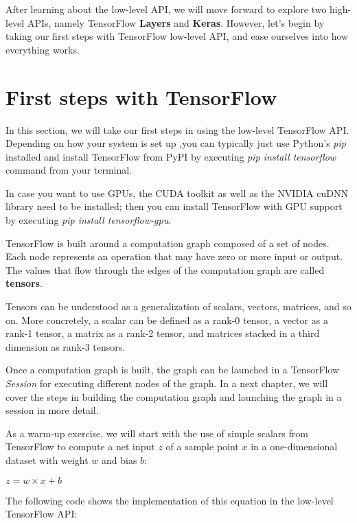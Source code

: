 \documentclass[11pt]{article}
\begin{document}
After learning about the low-level API, we will move forward to explore
two high-level APIs, namely TensorFlow \textbf{Layers} and
\textbf{Keras}. However, let's begin by taking our first steps with
TensorFlow low-level API, and ease ourselves into how everything works.

    \section{First steps with TensorFlow}\label{first-steps-with-tensorflow}

    In this section, we will take our first steps in using the low-level
TensorFlow API. Depending on how your system is set up ,you can
typically just use Python's \emph{pip} installed and install TensorFlow
from PyPI by executing \emph{pip install tensorflow} command from your
terminal.

In case you want to use GPUs, the CUDA toolkit as well as the NVIDIA
cuDNN library need to be installed; then you can install TensorFlow with
GPU support by executing \emph{pip install tensorflow-gpu}.

TensorFlow is built around a computation graph composed of a set of
nodes. Each node represents an operation that may have zero or more
input or output. The values that flow through the edges of the
computation graph are called \textbf{tensors}.

Tensors can be understood as a generalization of scalars, vectors,
matrices, and so on. More concretely, a scalar can be defined as a
rank-0 tensor, a vector as a rank-1 tensor, a matrix as a rank-2 tensor,
and matrices stacked in a third dimension as rank-3 tensors.

Once a computation graph is built, the graph can be launched in a
TensorFlow \emph{Session} for executing different nodes of the graph. In
a next chapter, we will cover the steps in building the computation
graph and launching the graph in a session in more detail.

As a warm-up exercise, we will start with the use of simple scalars from
TensorFlow to compute a net input \(z\) of a sample point \(x\) in a
one-dimensional dataset with weight \(w\) and bias \(b\):

\(z = w \times x + b\)

The following code shows the implementation of this equation in the
low-level TensorFlow API:
\end{document}
